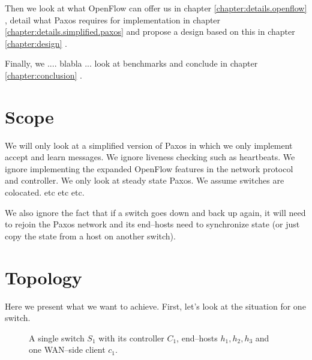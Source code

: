 Then we look at what OpenFlow can offer us in chapter
\ref{chapter:details.openflow}
, detail what Paxos requires for
implementation in chapter \ref{chapter:details.simplified.paxos} 
 and propose a
design based on this in chapter \ref{chapter:design} .

Finally, we .... blabla ... look at benchmarks and conclude in chapter
\ref{chapter:conclusion} .

\section{Scope}


We will only look at a simplified version of Paxos in which we only
implement accept and learn messages. We ignore liveness checking such as
heartbeats. We ignore implementing the expanded OpenFlow features in the
network protocol and controller. We only look at steady state Paxos.
We assume switches are colocated. etc etc etc.

We also ignore the fact that if a switch goes down and back up again, it
will need to rejoin the Paxos network and its end--hosts need to synchronize
state (or just copy the state from a host on another switch).

\section{Topology}


Here we present what we want to achieve.  First, let's look at the situation
for one switch.

\begin{figure}[H]
  \centering
  \caption{A single switch $S_1$ with its controller $C_1$, end--hosts
    $h_1, h_2, h_3$ and one WAN--side client $c_1$.}
  \label{figure:graph.single.switch}
\end{figure}

